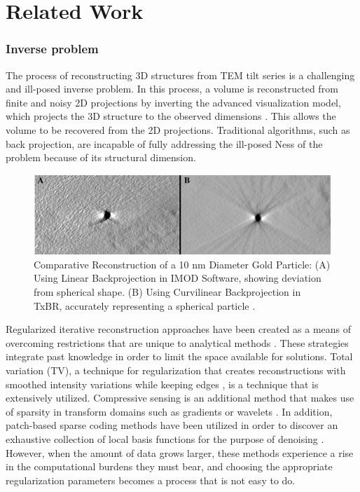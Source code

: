 \chapter{Related Work}\label{ch:Related Work}

\subsection{Inverse problem}
The process of reconstructing 3D structures from TEM tilt series is a challenging and ill-posed inverse problem. In this process, a volume is reconstructed from finite and noisy 2D projections by inverting the advanced visualization model, which projects the 3D structure to the observed dimensions \cite{Lin2020}. This allows the volume to be recovered from the 2D projections. Traditional algorithms, such as back projection, are incapable of fully addressing the ill-posed Ness of the problem because of its structural dimension.

\vspace{20pt}

\begin{figure}[thbp]
    \centering
    \includegraphics[width=.9\textwidth]{img/Inverse Problem.png}
    \caption{Comparative Reconstruction of a 10 nm Diameter Gold Particle: (A) Using Linear Backprojection in IMOD Software, showing deviation from spherical shape. (B) Using Curvilinear Backprojection in TxBR, accurately representing a spherical particle \cite{Lawrence2006}.  }\label{fig: Inverse problem comparative reconstruction}
\end{figure}

\vspace{10pt}


Regularized iterative reconstruction approaches have been created as a means of overcoming restrictions that are unique to analytical methods \cite{Widmer2013}. These strategies integrate past knowledge in order to limit the space available for solutions. Total variation (TV), a technique for regularization that creates reconstructions with smoothed intensity variations while keeping edges \cite{Widmer2013}, is a technique that is extensively utilized. Compressive sensing is an additional method that makes use of sparsity in transform domains such as gradients or wavelets \cite{Sorzano2004}. In addition, patch-based sparse coding methods have been utilized in order to discover an exhaustive collection of local basis functions for the purpose of denoising \cite{Zhang2017}. However, when the amount of data grows larger, these methods experience a rise in the computational burdens they must bear, and choosing the appropriate regularization parameters becomes a process that is not easy to do.

